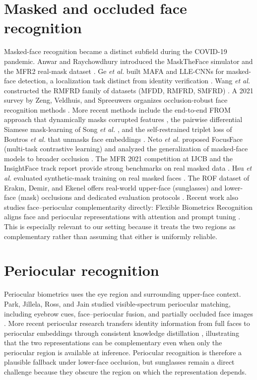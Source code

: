 \documentclass[12pt,a4paper,oneside]{report}
\begin{document}
\section{Masked and occluded face recognition}
Masked-face recognition became a distinct subfield during the COVID-19 pandemic. Anwar and Raychowdhury introduced the MaskTheFace simulator and the MFR2 real-mask dataset \cite{mfr2}. Ge \textit{et al.} built MAFA and LLE-CNNs for masked-face detection, a localization task distinct from identity verification \cite{llecnn}. Wang \textit{et al.} constructed the RMFRD family of datasets (MFDD, RMFRD, SMFRD) \cite{rmfrd}. A 2021 survey by Zeng, Veldhuis, and Spreeuwers organizes occlusion-robust face recognition methods \cite{surveyocc}. More recent methods include the end-to-end FROM approach that dynamically masks corrupted features \cite{from2022}, the pairwise differential Siamese mask-learning of Song \textit{et al.} \cite{masklearn}, and the self-restrained triplet loss of Boutros \textit{et al.} that unmasks face embeddings \cite{umr}. Neto \textit{et al.} proposed FocusFace (multi-task contrastive learning) \cite{focusface} and analyzed the generalization of masked-face models to broader occlusion \cite{beyondmasks}. The MFR 2021 competition at IJCB and the InsightFace track report provide strong benchmarks on real masked data \cite{mfr2021,insightfacemfr}. Hsu \textit{et al.} evaluated synthetic-mask training on real masked faces \cite{hsu2022}. The ROF dataset of Erak{\i}n, Demir, and Ekenel offers real-world upper-face (sunglasses) and lower-face (mask) occlusions and dedicated evaluation protocols \cite{rof}. Recent work also studies face--periocular complementarity directly: Flexible Biometrics Recognition aligns face and periocular representations with attention and prompt tuning \cite{fbr2024}. This is especially relevant to our setting because it treats the two regions as complementary rather than assuming that either is uniformly reliable.

\section{Periocular recognition}
Periocular biometrics uses the eye region and surrounding upper-face context. Park, Jillela, Ross, and Jain studied visible-spectrum periocular matching, including eyebrow cues, face--periocular fusion, and partially occluded face images \cite{periocular}. More recent periocular research transfers identity information from full faces to periocular embeddings through consistent knowledge distillation \cite{ckd2024}, illustrating that the two representations can be complementary even when only the periocular region is available at inference. Periocular recognition is therefore a plausible fallback under lower-face occlusion, but sunglasses remain a direct challenge because they obscure the region on which the representation depends.
\end{document}
